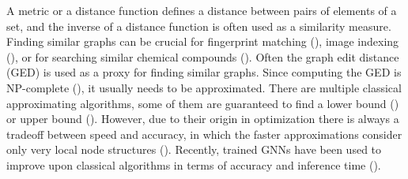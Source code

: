 A metric or a distance function defines a distance between pairs of elements of a set, and the inverse of a distance function is often used as a similarity measure. Finding similar graphs can be crucial for fingerprint matching (\citealp{fingerprint2005}), image indexing (\citealp{image_index2008}), or for searching similar chemical compounds (\citealp{chem2006}). Often the graph edit distance (GED) is used as a proxy for finding similar graphs. Since computing the GED is NP-complete (\citealp{np_complete1998}), it usually needs to be approximated. There are multiple classical approximating algorithms, some of them are guaranteed to find a lower bound (\citealp{hungarian2009}) or upper bound (\citealp{hed2015}). However, due to their origin in optimization there is always a tradeoff between speed and accuracy, in which the faster approximations consider only very local node structures (\citealp{hungarian2009}). Recently, trained GNNs have been used to improve upon classical algorithms in terms of accuracy and inference time (\citealp{bai2019}). %
